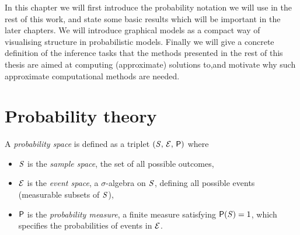 In this chapter we will first introduce the probability notation we will use in the rest of this work, and state some basic results which will be important in the later chapters. We will introduce graphical models as a compact way of visualising structure in probabilistic models. Finally we will give a concrete definition of the inference tasks that the methods presented in the rest of this thesis are aimed at computing (approximate) solutions to,and motivate why such approximate computational methods are needed.


\section{Probability theory}\label{sec:probability-theory}

A \emph{probability space} is defined as a triplet $(\mathit{S},\,\mathcal{E},\,\mathsf{P})$ where

\begin{itemize}
  \item $\mathit{S}$ is the \emph{sample space}, the set of all possible outcomes,
  \item $\mathcal{E}$ is the \emph{event space}, a $\sigma$-algebra on $\mathit{S}$, defining all possible events (measurable subsets of $\mathit{S}$),
  \item $\mathsf{P}$ is the \emph{probability measure}, a finite measure satisfying $\mathsf{P}(\mathit{S}) = 1$, which specifies the probabilities of events in $\mathcal{E}$.
\end{itemize}

